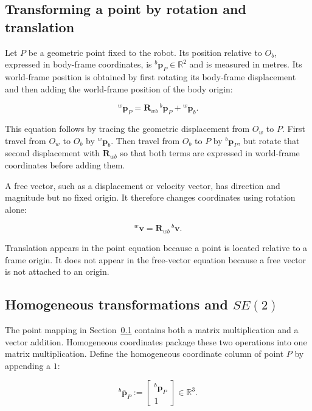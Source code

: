 \documentclass[
  australian,
  12pt,
  letterpaper,
  DIV=11,
  numbers=noendperiod,
  twoside]{scrreprt}
\begin{document}
\subsection{Transforming a point by rotation and
translation}\label{sec-se2-transforming-point}

Let \(P\) be a geometric point fixed to the robot. Its position relative
to \(O_b\), expressed in body-frame coordinates, is
\({}^{b}\mathbf p_P\in\mathbb R^2\) and is measured in metres. Its
world-frame position is obtained by first rotating its body-frame
displacement and then adding the world-frame position of the body
origin:

\[
\boxed{
{}^{w}\mathbf p_P
=
\mathbf R_{wb}\,{}^{b}\mathbf p_P
+
{}^{w}\mathbf p_b
}.
\]

This equation follows by tracing the geometric displacement from \(O_w\)
to \(P\). First travel from \(O_w\) to \(O_b\) by \({}^{w}\mathbf p_b\).
Then travel from \(O_b\) to \(P\) by \({}^{b}\mathbf p_P\), but rotate
that second displacement with \(\mathbf R_{wb}\) so that both terms are
expressed in world-frame coordinates before adding them.

A free vector, such as a displacement or velocity vector, has direction
and magnitude but no fixed origin. It therefore changes coordinates
using rotation alone:

\[
{}^{w}\mathbf v
=
\mathbf R_{wb}\,{}^{b}\mathbf v.
\]

Translation appears in the point equation because a point is located
relative to a frame origin. It does not appear in the free-vector
equation because a free vector is not attached to an origin.

\subsection{\texorpdfstring{Homogeneous transformations and
\(SE(2)\)}{Homogeneous transformations and SE(2)}}\label{homogeneous-transformations-and-se2}

The point mapping in Section~\ref{sec-se2-transforming-point} contains
both a matrix multiplication and a vector addition. Homogeneous
coordinates package these two operations into one matrix multiplication.
Define the homogeneous coordinate column of point \(P\) by appending a
\(1\):

\[
{}^{b}\overline{\mathbf p}_P
\mathrel{:=}
\begin{bmatrix}
{}^{b}\mathbf p_P\\
1
\end{bmatrix}
\in\mathbb R^3.
\]
\end{document}
